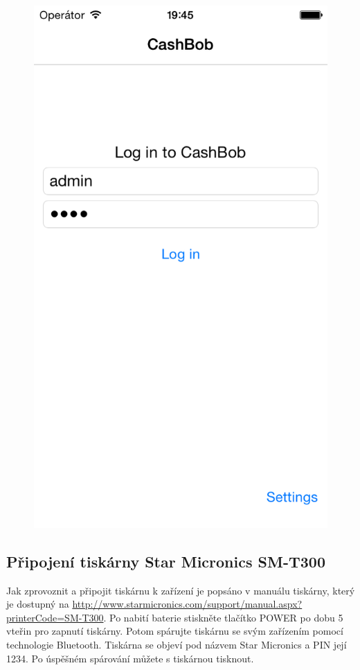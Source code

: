 \begin{figure}[h]
\begin{minipage}{.5\textwidth}
  \includegraphics[width=.95\textwidth]{login.png}
  \label{fig:loginpage}
\end{minipage}
\end{figure}

\subsection{Připojení tiskárny Star Micronics SM-T300}
Jak zprovoznit a připojit tiskárnu k zařízení je popsáno v manuálu tiskárny, který je dostupný na \url{http://www.starmicronics.com/support/manual.aspx?printerCode=SM-T300}.
Po nabití baterie stiskněte tlačítko POWER po dobu 5 vteřin pro zapnutí tiskárny.
Potom spárujte tiskárnu se svým zařízením pomocí technologie Bluetooth.
Tiskárna se objeví pod názvem Star Micronics a PIN její 1234.
Po úspěšném spárování můžete s tiskárnou tisknout.

